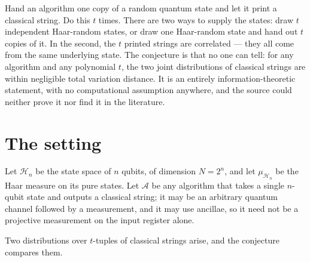 \documentclass{aicr-conjecture}
\newcommand{\muH}{\mu_{\mathcal{H}_{n}}}
\newcommand{\A}{\mathcal{A}}
\begin{document}

\vspace{0.4em}

\begin{informalconjecture}
Hand an algorithm one copy of a random quantum state and let it print a
classical string. Do this $t$ times. There are two ways to supply the
states: draw $t$ independent Haar-random states, or draw one Haar-random
state and hand out $t$ copies of it. In the second, the $t$ printed
strings are correlated --- they all come from the same underlying state.
The conjecture is that no one can tell: for any algorithm and any
polynomial $t$, the two joint distributions of classical strings are
within negligible total variation distance. It is an entirely
information-theoretic statement, with no computational assumption
anywhere, and the source could neither prove it nor find it in the
literature.
\end{informalconjecture}

\section{The setting}\label{sec:setting}

Let $\mathcal{H}_{n}$ be the state space of $n$ qubits, of dimension
$N = 2^{n}$, and let $\muH$ be the Haar measure on its pure states. Let
$\A$ be any algorithm that takes a single $n$-qubit state and outputs a
classical string; it may be an arbitrary quantum channel followed by a
measurement, and it may use ancillae, so it need not be a projective
measurement on the input register alone.

Two distributions over $t$-tuples of classical strings arise, and the
conjecture compares them.
\end{document}
